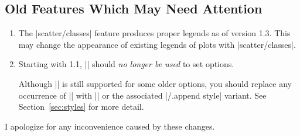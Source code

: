 \subsection{Old Features Which May Need Attention}

\begin{enumerate}
    \item The |scatter/classes| feature produces proper legends as of version
        1.3. This may change the appearance of existing legends of plots with
        |scatter/classes|.
    \item Starting with \PGFPlots{} 1.1, |\tikzstyle| should \emph{no longer
        be used} to set \PGFPlots{} options.

        Although |\tikzstyle| is still supported for some older \PGFPlots{}
        options, you should replace any occurrence of |\tikzstyle| with
        ||
        or the associated |/.append style| variant. See
        Section~\ref{sec:styles} for more detail.
\end{enumerate}
%
I apologize for any inconvenience caused by these changes.

